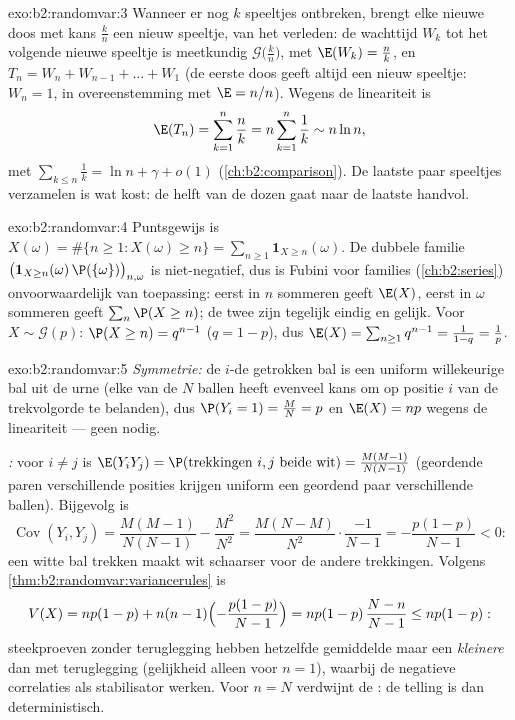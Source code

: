 \begin{solution}{exo:b2:randomvar:3}
Wanneer er nog $k$ speeltjes ontbreken, brengt elke nieuwe doos met
kans $\frac kn$ een nieuw speeltje,  van het verleden:
de wachttijd $W_k$ tot het volgende nieuwe speeltje is meetkundig
$\mathcal{G}\bigl(\frac kn\bigr)$, met $\E(W_k) = \frac nk$, en
$T_n = W_n + W_{n-1} + \dots + W_1$ (de eerste doos geeft altijd
een nieuw speeltje: $W_n = 1$, in overeenstemming met $\E = n/n$).
Wegens de lineariteit is
\[
\E(T_n) = \sum_{k=1}^n \frac nk = n\sum_{k=1}^n\frac1k
\sim n\ln n ,
\]
met $\sum_{k\leq n}\frac1k = \ln n + \gamma + o(1)$
(\cref{ch:b2:comparison}). De laatste paar speeltjes verzamelen is
wat kost: de helft van de dozen gaat naar de laatste handvol.
\end{solution}

\begin{solution}{exo:b2:randomvar:4}
Puntsgewijs is $X(\omega) = \#\{n \geq 1 : X(\omega) \geq n\} =
\sum_{n\geq1}\mathbf{1}_{X \geq n}(\omega)$. De dubbele familie
$\bigl(\mathbf{1}_{X \geq n}(\omega)\,\P(\{\omega\})\bigr)_{n,
\omega}$ is niet-negatief, dus is Fubini voor families
(\cref{ch:b2:series}) onvoorwaardelijk van toepassing: eerst in $n$
sommeren geeft $\E(X)$, eerst in $\omega$ sommeren geeft $\sum_n
\P(X \geq n)$; de twee zijn tegelijk eindig en gelijk. Voor $X \sim
\mathcal{G}(p)$: $\P(X \geq n) = q^{n-1}$ ($q = 1-p$), dus $\E(X) =
\sum_{n\geq1}q^{n-1} = \frac{1}{1 - q} = \frac1p$.
\end{solution}

\begin{solution}{exo:b2:randomvar:5}
\emph{Symmetrie:} de $i$-de getrokken bal is een uniform
willekeurige bal uit de urne (elke van de $N$ ballen heeft evenveel
kans om op positie $i$ van de trekvolgorde te belanden), dus $\P(Y_i
= 1) = \frac MN = p$ en $\E(X) = np$ wegens de lineariteit --- geen
 nodig.

\emph{:} voor $i \neq j$ is $\E(Y_iY_j) =
\P(\text{trekkingen } i, j \text{ beide wit}) =
\frac{M(M-1)}{N(N-1)}$ (geordende paren verschillende posities
krijgen uniform een geordend paar verschillende ballen). Bijgevolg
is
\[
\operatorname{Cov}(Y_i, Y_j)
= \frac{M(M-1)}{N(N-1)} - \frac{M^2}{N^2}
= \frac{M(N - M)}{N^2}\cdot\frac{-1}{N-1}
= -\frac{p(1-p)}{N-1} < 0 :
\]
een witte bal trekken maakt wit schaarser voor de andere
trekkingen. Volgens \cref{thm:b2:randomvar:variancerules} is
\[
V(X) = np(1-p) + n(n-1)\Bigl(-\frac{p(1-p)}{N-1}\Bigr)
= np(1-p)\,\frac{N - n}{N - 1} \leq np(1-p) :
\]
steekproeven zonder teruglegging hebben hetzelfde gemiddelde maar
een \emph{kleinere}  dan met teruglegging (gelijkheid
alleen voor $n = 1$), waarbij de negatieve correlaties als
stabilisator werken. Voor $n = N$ verdwijnt de : de
telling is dan deterministisch.
\end{solution}

